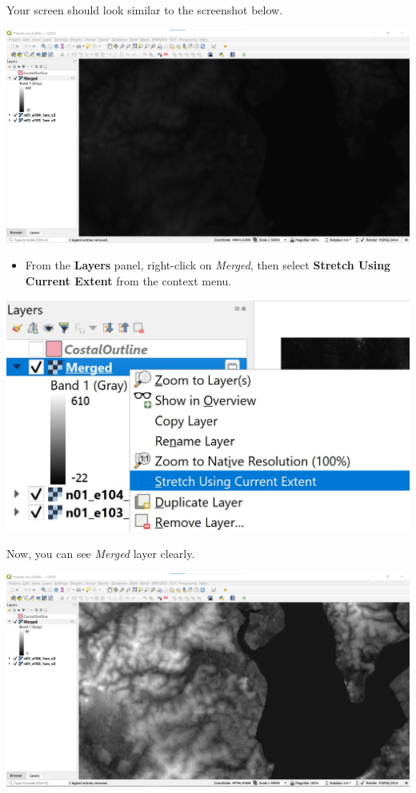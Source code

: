 \documentclass[
  letterpaper,
  DIV=11,
  numbers=noendperiod]{scrreprt}
\providecommand{\tightlist}{%
  \setlength{\itemsep}{0pt}\setlength{\parskip}{0pt}}\usepackage{longtable,booktabs,array}
\begin{document}
Your screen should look similar to the screenshot below.

\includegraphics{./img06/image44.jpg}

\begin{itemize}
\tightlist
\item
  From the \textbf{Layers} panel, right-click on \emph{Merged}, then
  select \textbf{Stretch Using Current Extent} from the context menu.
\end{itemize}

\includegraphics{./img06/image45.jpg}

Now, you can see \emph{Merged} layer clearly.

\includegraphics{./img06/image46.jpg}
\end{document}
